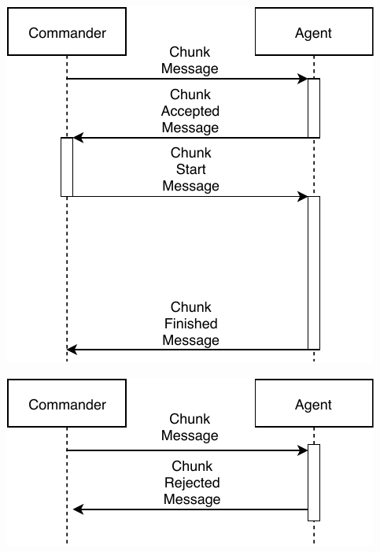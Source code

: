 \begin{minipage}[ht]{0.48\textwidth}
	\includegraphics[width=\textwidth]{Resources/PDF/ChunkAcceptedHandshake}
\end{minipage}
\hfill
\begin{minipage}[ht]{0.48\textwidth}
	\includegraphics[width=\textwidth]{Resources/PDF/ChunkRejectHandshake}
\end{minipage}

\begin{minipage}[ht]{0.48\textwidth}
	\label{pic:AcceptHandshake}
\end{minipage}
\hfill
\begin{minipage}[ht]{0.48\textwidth}
	\label{pic:RejectHandshake}
\end{minipage}
